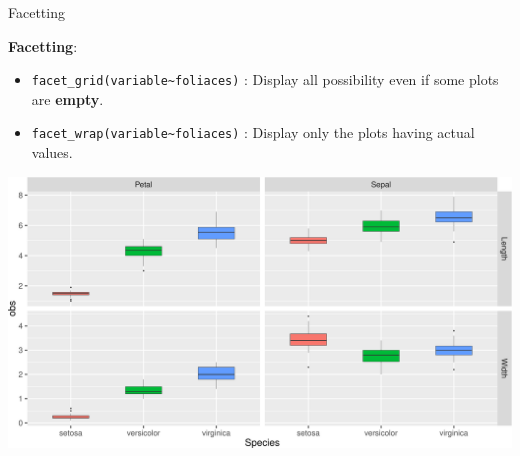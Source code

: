\documentclass[14pt,ignorenonframetext,]{bredelebeamer}
\providecommand{\tightlist}{%
  \setlength{\itemsep}{0pt}\setlength{\parskip}{0pt}}
\begin{document}
\begin{frame}[fragile]{Facetting}

\textbf{Facetting}:

\begin{itemize}
\tightlist
\item
  \texttt{facet\_grid(variable\textasciitilde{}foliaces)} : Display all
  possibility even if some plots are \textbf{empty}.
\item
  \texttt{facet\_wrap(variable\textasciitilde{}foliaces)} : Display only
  the plots having actual values.
\end{itemize}

\includegraphics{tidyverse_28_03_files/figure-beamer/ggplot12-1.pdf}

\end{frame}
\end{document}

